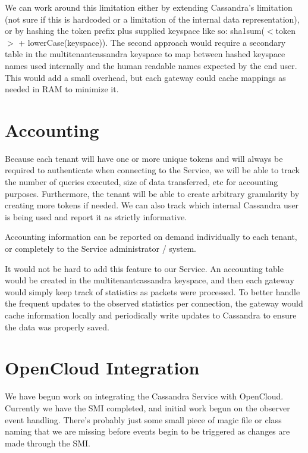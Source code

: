 \documentclass[11pt,notitlepage]{report}
\begin{document}
We can work around this limitation either by extending Cassandra's limitation (not sure if this is hardcoded or a limitation of the internal data representation), or by hashing the token prefix plus supplied keyspace like so: sha1sum($<$token$>$ + lowerCase(keyspace)). The second approach would require a secondary table in the multitenantcassandra keyspace to map between hashed keyspace names used internally and the human readable names expected by the end user. This would add a small overhead, but each gateway could cache mappings as needed in RAM to minimize it.


\section*{Accounting}

Because each tenant will have one or more unique tokens and will always be required to authenticate when connecting to the Service, we will be able to track the number of queries executed, size of data transferred, etc for accounting purposes. Furthermore, the tenant will be able to create arbitrary granularity by creating more tokens if needed. We can also track which internal Cassandra user is being used and report it as strictly informative.

Accounting information can be reported on demand individually to each tenant, or completely to the Service administrator / system.

It would not be hard to add this feature to our Service. An accounting table would be created in the multitenantcassandra keyspace, and then each gateway would simply keep track of statistics as packets were processed. To better handle the frequent updates to the observed statistics per connection, the gateway would cache information locally and periodically write updates to Cassandra to ensure the data was properly saved.

\section*{OpenCloud Integration}

We have begun work on integrating the Cassandra Service with OpenCloud. Currently we have the SMI completed, and initial work begun on the observer event handling. There's probably just some small piece of magic file or class naming that we are missing before events begin to be triggered as changes are made through the SMI.
\end{document}

